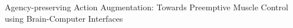 









Agency-preserving Action Augmentation: Towards Preemptive Muscle Control using Brain-Computer
Interfaces



